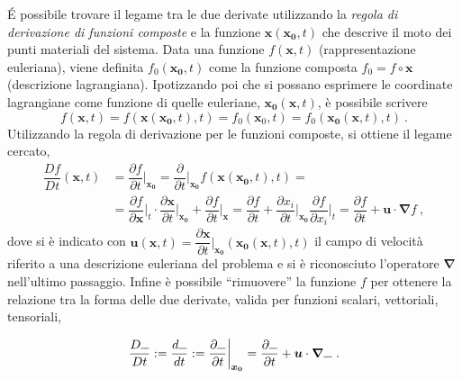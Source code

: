 \'E possibile trovare il legame tra le due derivate utilizzando la \textit{regola di derivazione di funzioni composte} e la funzione $\bm{x}(\bm{x_0},t)$ che descrive il moto dei punti materiali del sistema.
Data una funzione $f(\bm{x},t)$ (rappresentazione euleriana), viene definita $f_0(\bm{x_0},t)$ come la funzione composta $f_0 = f \circ \bm{x}$ (descrizione lagrangiana). Ipotizzando poi che si possano esprimere le coordinate lagrangiane come funzione di quelle euleriane, $\bm{x_0}(\bm{x},t)$, è possibile scrivere
\begin{equation}
 f(\bm{x},t) = f(\bm{x}(\bm{x_0},t),t) = f_0(\bm{x}_0,t) = f_0(\bm{x_0}(\bm{x},t),t) \ .
\end{equation}
Utilizzando la regola di derivazione per le funzioni composte, si ottiene il legame cercato,
\begin{equation}\label{eqn:cin:lagr-eul}
\begin{aligned}
 \dfrac{D f}{D t}(\bm{x},t) & = \dfrac{\partial f}{\partial t}\bigg|_{\bm{x_0}} = \dfrac{\partial}{\partial t}\bigg|_{\bm{x_0}} f(\bm{x}(\bm{x_0},t),t) =  \\ 
  & = \dfrac{\partial f}{\partial \bm{x}}\bigg|_{t} \cdot \dfrac{\partial \bm{x}}{\partial t}\bigg|_{\bm{x_0}} 
  + \dfrac{\partial f}{\partial t}\bigg|_{\bm{x}} = 
  \dfrac{\partial f}{\partial t} +  
  \dfrac{\partial x_i}{\partial t}\bigg|_{\bm{x_0}} \dfrac{\partial f}{\partial x_i}\bigg|_{t}  = 
  \dfrac{\partial f}{\partial t} + \bm{u} \cdot \bm{\nabla} f \ ,
\end{aligned}
\end{equation}
dove si è indicato con $\bm{u}(\bm{x},t) = \dfrac{\partial \bm{x}}{\partial t}\bigg|_{\bm{x_0}} (\bm{x_0}(\bm{x},t),t)$ il campo di velocità riferito a una descrizione euleriana del problema e si è riconosciuto l'operatore $\bm{\nabla}$ nell'ultimo passaggio. Infine è possibile ``rimuovere'' la funzione $f$ per ottenere la relazione tra la forma delle due derivate, valida per funzioni scalari, vettoriali, tensoriali,
\begin{fBox}
\begin{equation}\label{eqn:cin:lagr-eul}
 \dfrac{D \rule{1.5ex}{.4pt}}{D t} := \dfrac{d \rule{1.5ex}{.4pt}}{d t} := \dfrac{\partial \rule{1.5ex}{.4pt}}{\partial t}\bigg|_{\bm{x_0}} = \dfrac{\partial \rule{1.5ex}{.4pt}}{\partial t} + \bm{u} \cdot \bm{\nabla} \rule{1.5ex}{.4pt} \ .
\end{equation}
\end{fBox}

